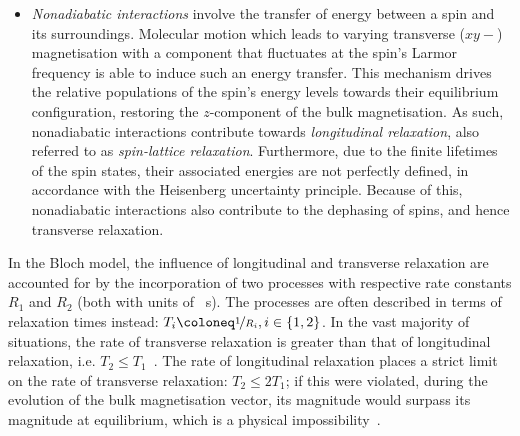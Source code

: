 {\begin{itemize}
            effect of this is for the transverse component of the bulk
            magnetisation to decay. Hence, adiabatic interactions contribute to
            \emph{transverse relaxation}, also referred to as \emph{spin-spin
            relaxation}.
        \item \emph{Nonadiabatic interactions} involve the transfer of energy
            between a spin and its surroundings. Molecular motion which leads
            to varying transverse ($xy-$) magnetisation with a component that
            fluctuates at the spin's Larmor frequency is able to induce such an
            energy transfer. This mechanism drives the relative populations of
            the spin's energy levels towards their equilibrium configuration,
            restoring the $z$-component of the bulk magnetisation.
            As such, nonadiabatic interactions contribute towards
            \emph{longitudinal relaxation}, also referred to as
            \emph{spin-lattice relaxation}.
            Furthermore, due to the finite lifetimes of the spin states,
            their associated energies are not perfectly defined, in accordance
            with the Heisenberg uncertainty principle. Because of this,
            nonadiabatic interactions also contribute to the dephasing of
            spins, and hence transverse relaxation.
    \end{itemize}
    In the Bloch model, the influence of longitudinal and transverse relaxation are
    accounted for by the incorporation of two processes with respective rate
    constants $R_1$ and $R_2$ (both with units of \unit{\per\second}). The
    processes are often described in terms of relaxation times
    instead: $T_i \coloneq \nicefrac{1}{R_i}, i \in \lbrace 1, 2\rbrace$.  In
    the vast majority of situations, the rate of transverse relaxation is
    greater than that of longitudinal relaxation, i.e. $T_2 \leq
    T_1$~\cite[Section 11.9]{Levitt2007}. The rate of longitudinal relaxation
    places a strict limit on the rate of transverse relaxation: $T_2 \leq 2
    T_1$; if this were violated, during the evolution of the bulk magnetisation
    vector, its magnitude would surpass its magnitude at equilibrium, which is
    a physical impossibility~\cite{Traficante1991}.
}


